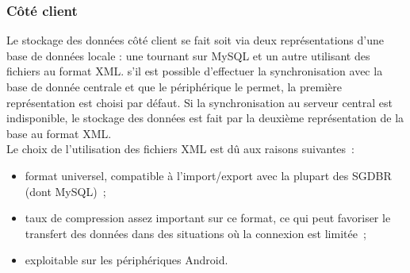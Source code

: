 \subsubsection{Côté client}
Le stockage des données côté client se fait soit via deux représentations d'une base de données locale : une tournant sur MySQL et un autre utilisant des fichiers au format XML. s'il est possible d'effectuer la synchronisation avec la base de donnée centrale et que le périphérique le permet, la première représentation est choisi par défaut. Si la synchronisation au serveur central est indisponible, le stockage des données est fait par la deuxième représentation de la base au format XML. \\
Le choix de l'utilisation des fichiers XML est dû aux raisons suivantes~:
\begin{itemize}
	\item format universel, compatible à l'import/export avec la plupart des SGDBR (dont MySQL)~;
	\item taux de compression assez important sur ce format, ce qui peut favoriser le transfert des données dans des situations où la connexion est limitée~;
	\item exploitable sur les périphériques Android.
\end{itemize}

